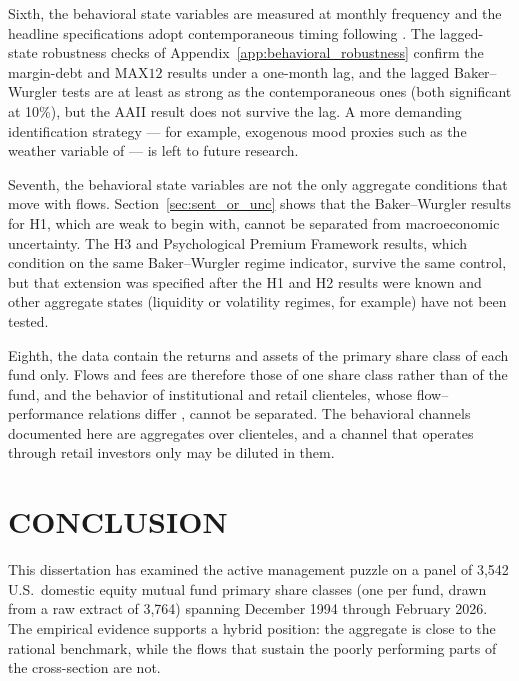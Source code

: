 \documentclass[12pt, oneside]{report}
\begin{document}
Sixth, the behavioral state variables are measured at monthly frequency
and the headline specifications adopt contemporaneous timing following
\textcite{BakerWurgler2007}. The lagged-state robustness checks of
Appendix~\ref{app:behavioral_robustness} confirm the margin-debt and
$\text{MAX12}$ results under a one-month lag, and the lagged
Baker--Wurgler tests are at least as strong as the contemporaneous ones
(both significant at 10\%), but the AAII result does not survive the
lag. A more demanding identification strategy --- for example,
exogenous mood proxies such as the weather variable of
\textcite{HirshleiferShumway2003} --- is left to future research.

Seventh, the behavioral state variables are not the only aggregate
conditions that move with flows. Section~\ref{sec:sent_or_unc} shows that
the Baker--Wurgler results for H1, which are weak to begin with, cannot be
separated from macroeconomic uncertainty. The H3 and Psychological Premium Framework results, which
condition on the same Baker--Wurgler regime indicator, survive the same
control, but that extension was specified after the H1 and H2 results
were known and other aggregate states (liquidity or volatility
regimes, for example) have not been tested.

Eighth, the data contain the returns and assets of the primary share
class of each fund only. Flows and fees are therefore those of one share
class rather than of the fund, and the behavior of institutional and
retail clienteles, whose flow--performance relations differ
\parencite{DelGuercioTkac2002}, cannot be separated. The behavioral channels
documented here are aggregates over clienteles, and a channel that
operates through retail investors only may be diluted in them.

\chapter{CONCLUSION}
\label{ch:conclusion}

\noindent This dissertation has examined the active management puzzle on a
panel of 3{,}542 U.S.\ domestic equity mutual fund primary share classes
(one per fund, drawn from a raw extract of 3{,}764) spanning December 1994
through February 2026. The
empirical evidence supports a hybrid position: the aggregate is close to
the rational benchmark, while the flows that sustain the poorly
performing parts of the cross-section are not.
\end{document}
